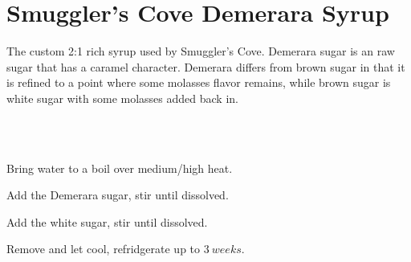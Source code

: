 \section[SC Demerara Syrup]{Smuggler's Cove Demerara Syrup~\vegan}


\begin{recipestats}[
	servings=$\approx~1\onehalf~Cup$,
	preptime=5~\minute,
	original=\citefield{smugglersCove}{shorttitle} \cite{smugglersCove},
]
\end{recipestats}

\begin{recipeabstract}
	The custom 2:1 rich syrup used by Smuggler's Cove.
	Demerara sugar is an raw sugar that has a caramel character.
	Demerara differs from brown sugar in that it is refined to a point where some molasses flavor remains,
		while brown sugar is white sugar with some molasses added back in.
\end{recipeabstract}


\begin{ingredientcolumns}[1]
	\begin{ingredientblock}
		\\
		\\
	\end{ingredientblock}
\end{ingredientcolumns}


\begin{preparation}
\item Bring water to a boil over medium/high heat.
\item Add the Demerara sugar, stir until dissolved.
\item Add the white sugar, stir until dissolved.
\item Remove and let cool, refridgerate up to $3~weeks$.
\end{preparation}


\recipeend
